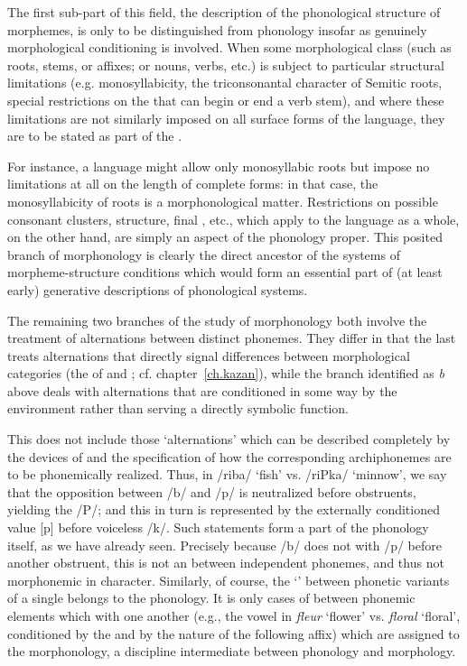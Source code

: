 The first sub-part of this field, the description of the phonological
structure of morphemes, is only to be distinguished from phonology
insofar as genuinely morphological conditioning is involved. When some
morphological class (such as roots, stems, or affixes; or nouns,
verbs, etc.) is subject to particular structural limitations
(e.g. monosyllabicity, the triconsonantal character of Semitic roots,
special restrictions on the  that can begin or end a verb
stem), and where these limitations are not similarly imposed on all
surface forms of the language, they are to be stated as part of the
.

For instance, a language might allow only monosyllabic roots but
impose no limitations at all on the length of complete forms: in that
case, the monosyllabicity of roots is a morphonological
matter. Restrictions on possible consonant clusters, 
structure, final , etc., which apply to the language as a
whole, on the other hand, are simply an aspect of the phonology
proper. This posited branch of morphonology is clearly the direct
ancestor of the systems of morpheme-structure conditions which would
form an essential part of (at least early) generative descriptions of
phonological systems.

The remaining two branches of the study of morphonology both involve
the treatment of alternations between distinct phonemes. They differ
in that the last treats alternations that directly signal differences
between morphological categories (the  of {\Kruszewski} and
{\Baudouin}; cf. chapter~\ref{ch.kazan}), while the branch identified as
\emph{b} above deals with alternations that are conditioned in some
way by the environment rather than serving a directly symbolic
function.

This does not include those `alternations' which can be described
completely by the devices of  and the specification of
how the corresponding archiphonemes are to be phonemically
realized. Thus, in  /riba/ `fish' vs. /riPka/ `minnow', we say
that the opposition between /b/ and /p/ is neutralized before
obstruents, yielding the  /P/; and this in turn is
represented by the externally conditioned value {[p]} before voiceless
/k/. Such statements form a part of the phonology itself, as we have
already seen. Precisely because /b/ does not  with /p/ before
another obstruent, this is not an  between independent
phonemes, and thus not morphonemic in character. Similarly, of course,
the `' between phonetic variants of a single 
belongs to the phonology. It is only cases of  between
phonemic elements which  with one another (e.g., the vowel
 in  \emph{fleur} `flower' vs. \emph{floral}
`floral', conditioned by the  and by the nature of the following
affix) which are assigned to the morphonology, a discipline
intermediate between phonology and morphology.

